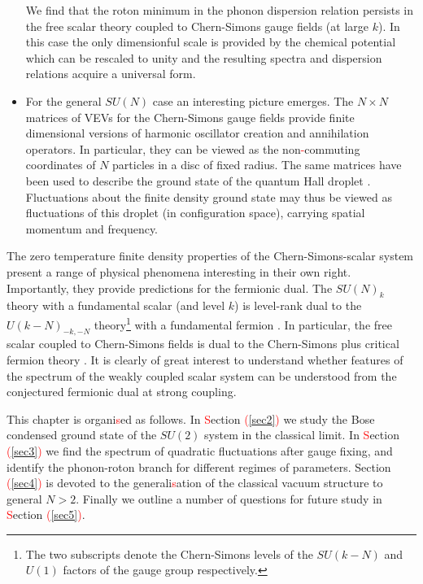 \begin{itemize}
{ We find that the roton minimum in the phonon dispersion relation persists in the free scalar theory coupled to Chern-Simons gauge fields (at large $k$). In this case the only dimensionful scale is provided by the chemical potential which can be rescaled to unity and the resulting spectra and dispersion relations acquire a universal form.  }
 \item{For the general $SU(N)$ case an interesting picture emerges. The $N\times N$ matrices of VEVs for the Chern-Simons gauge fields provide  finite dimensional versions of harmonic oscillator  creation and annihilation operators. In particular, they can be viewed as the non\textcolor{red}{-}commuting coordinates of $N$ particles in a disc of fixed radius. The same matrices have been used to describe the ground state of the quantum Hall droplet \cite{Polychronakos:2001mi, Susskind:2001fb}. Fluctuations about the finite density ground state  may thus be viewed as fluctuations of this droplet (in configuration space), carrying spatial momentum and frequency.}
  \end{itemize}
 The zero temperature finite density properties of the Chern-Simons-scalar system present a range of physical phenomena interesting in their own right. Importantly, they provide predictions for the fermionic dual.  The $SU(N)_k$  theory with a fundamental scalar (and level $k$) is level-rank dual to the $U(k-N)_{-k, -N}$ theory\footnote{The two subscripts denote the Chern-Simons levels of the $SU(k-N)$ and $U(1)$ factors of the gauge group respectively.} with a fundamental fermion \cite{Aharony:2015mjs}. In particular, the free scalar coupled to Chern-Simons fields is dual to the Chern-Simons plus critical fermion theory \cite{Minwalla:2015sca}. It is clearly of great interest to understand whether features of the spectrum of the weakly coupled scalar system can be understood from the conjectured fermionic dual at strong coupling.
 
 This chapter is organi\textcolor{red}{s}ed as follows. In \textcolor{red}{S}ection \textcolor{red}{(}\ref{sec2}\textcolor{red}{)} we study the Bose condensed ground state of the $SU(2)$ system in the classical limit. In \textcolor{red}{S}ection \textcolor{red}{(}\ref{sec3}\textcolor{red}{)} we find the spectrum of quadratic fluctuations after gauge fixing, and identify the phonon-roton branch for different regimes of parameters. Section \textcolor{red}{(}\ref{sec4}\textcolor{red}{)} is devoted to the generali\textcolor{red}{s}ation of the classical vacuum structure to general $N>2$.  Finally we outline a number of questions for future study in \textcolor{red}{S}ection \textcolor{red}{(}\ref{sec5}\textcolor{red}{)}.
 
